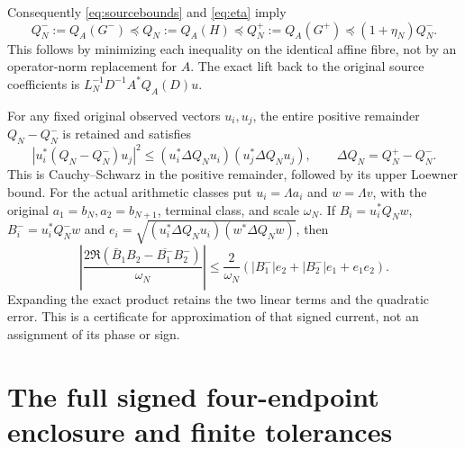 \documentclass[11pt]{article}
\begin{document}
Consequently \eqref{eq:sourcebounds} and \eqref{eq:eta} imply
\begin{equation}\label{eq:Qbounds}
 \boxed{Q_N^-:=Q_A(G^-)\preceq Q_N:=Q_A(H)
 \preceq Q_N^+:=Q_A(G^+)\preceq(1+\eta_N)Q_N^-.}
\end{equation}
This follows by minimizing each inequality on the identical affine
fibre, not by an operator-norm replacement for $A$.  The exact lift
back to the original source coefficients is
$L_N^{-1}D^{-1}A^*Q_A(D)u$.

For any fixed original observed vectors $u_i,u_j$, the entire
positive remainder $Q_N-Q_N^-$ is retained and satisfies
\begin{equation}\label{eq:crosserror}
 |u_i^*(Q_N-Q_N^-)u_j|^2
 \le (u_i^*\Delta Q_Nu_i)(u_j^*\Delta Q_Nu_j),\qquad
 \Delta Q_N=Q_N^+-Q_N^-.
\end{equation}
This is Cauchy--Schwarz in the positive remainder, followed by its
upper Loewner bound.  For the actual arithmetic classes put
$u_i=\Lambda a_i$ and $w=\Lambda v$, with the original
$a_1=b_N,a_2=b_{N+1}$, terminal class, and scale $\omega_N$.
If $B_i=u_i^*Q_Nw$, $B_i^-=u_i^*Q_N^-w$ and
$e_i=\sqrt{(u_i^*\Delta Q_Nu_i)(w^*\Delta Q_Nw)}$, then
\begin{equation}\label{eq:signedcurrent}
 \left|\frac{2\Re(\bar B_1B_2-\overline{B_1^-}B_2^-)}{\omega_N}\right|
 \le\frac2{\omega_N}
 (|B_1^-|e_2+|B_2^-|e_1+e_1e_2).
\end{equation}
Expanding the exact product retains the two linear terms and the
quadratic error.  This is a certificate for approximation of that
signed current, not an assignment of its phase or sign.

\section{The full signed four-endpoint enclosure and finite tolerances}
\end{document}
